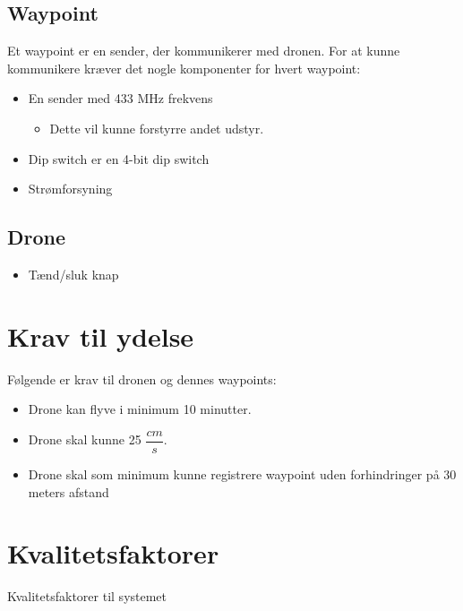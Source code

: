 \documentclass[Main]{subfiles}
\begin{document}
\subsection{Waypoint}
Et waypoint er en sender, der kommunikerer med dronen.
For at kunne kommunikere kræver det nogle komponenter for hvert waypoint:

	\begin{itemize}
	\item En sender med 433 MHz frekvens
	
		\begin{itemize}
		\item Dette vil kunne forstyrre andet udstyr.
		\end{itemize}
	
	\item Dip switch er en 4-bit dip switch
	
	\item Strømforsyning 
	\end{itemize}
	
	
	
\subsection{Drone}

	\begin{itemize}
	\item Tænd/sluk knap
	\end{itemize}





\section{Krav til ydelse}
Følgende er krav til dronen og dennes waypoints:

	\begin{itemize}
	\item Drone kan flyve i minimum 10 minutter.
	\item Drone skal kunne 25 $\dfrac{cm}{s}$.
	\item Drone skal som minimum kunne registrere waypoint uden forhindringer på 30 meters afstand
	\end{itemize}



\section{Kvalitetsfaktorer}
Kvalitetsfaktorer til systemet
\end{document}
